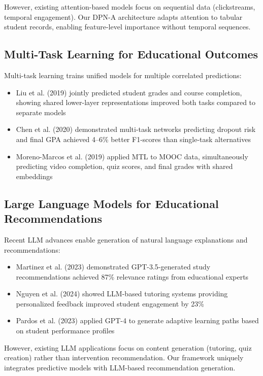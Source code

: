 However, existing attention-based models focus on sequential data (clickstreams, temporal engagement). Our DPN-A architecture adapts attention to tabular student records, enabling feature-level importance without temporal sequences.

\subsection{Multi-Task Learning for Educational Outcomes}

Multi-task learning trains unified models for multiple correlated predictions:

\begin{itemize}
\item Liu et al. (2019) jointly predicted student grades and course completion, showing shared lower-layer representations improved both tasks compared to separate models
\item Chen et al. (2020) demonstrated multi-task networks predicting dropout risk and final GPA achieved 4--6\% better F1-scores than single-task alternatives
\item Moreno-Marcos et al. (2019) applied MTL to MOOC data, simultaneously predicting video completion, quiz scores, and final grades with shared embeddings
\end{itemize}

\subsection{Large Language Models for Educational Recommendations}

Recent LLM advances enable generation of natural language explanations and recommendations:

\begin{itemize}
\item Martinez et al. (2023) demonstrated GPT-3.5-generated study recommendations achieved 87\% relevance ratings from educational experts
\item Nguyen et al. (2024) showed LLM-based tutoring systems providing personalized feedback improved student engagement by 23\%
\item Pardos et al. (2023) applied GPT-4 to generate adaptive learning paths based on student performance profiles
\end{itemize}

However, existing LLM applications focus on content generation (tutoring, quiz creation) rather than intervention recommendation. Our framework uniquely integrates predictive models with LLM-based recommendation generation.

